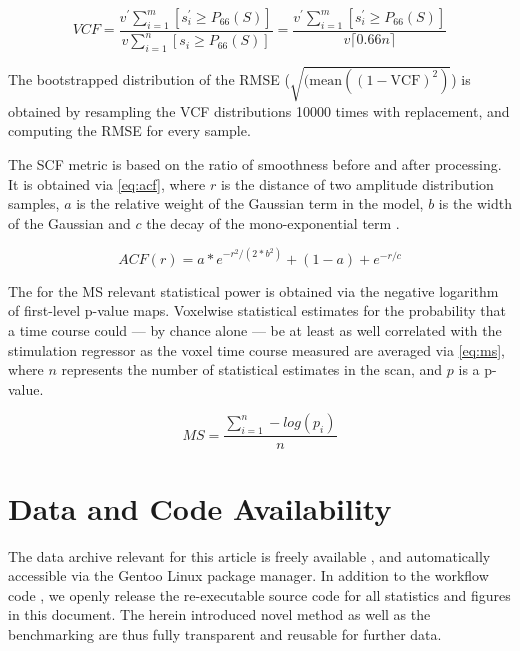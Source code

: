 \begin{equation} \label{eq:vcf}
        V\!C\!F
        = \frac{v^\prime\sum_{i=1}^m [s^\prime_i \geq P_{66}(S)]}{v\sum_{i=1}^n [s_i \geq P_{66}(S)]}
        = \frac{v^\prime\sum_{i=1}^m [s^\prime_i \geq P_{66}(S)]}{v \lceil0.66n\rceil}
\end{equation}

The bootstrapped distribution of the RMSE ($\sqrt{(\text{mean}((1 - \text{VCF})^2)}$) is obtained by resampling the VCF distributions 10000 times with replacement, and computing the RMSE for every sample.

The SCF metric is based on the ratio of smoothness before and after processing.
It is obtained via \cref{eq:acf}, where $r$ is the distance of two amplitude distribution samples, $a$ is the relative weight of the Gaussian term in the model, $b$ is the width of the Gaussian and $c$ the decay of the mono-exponential term \cite{cox2017fmri}.

\begin{equation} \label{eq:acf}
        ACF(r)
        = a * e^{ -r^{2}/ (2 * b^{2}) } + (1 - a) + e^{-r/c}
\end{equation}

The for the MS relevant statistical power is obtained via the negative logarithm of first-level p-value maps.
Voxelwise statistical estimates for the probability that a time course could --- by chance alone --- be at least as well correlated with the stimulation regressor as the voxel time course measured are averaged via \cref{eq:ms}, where $n$ represents the number of statistical estimates in the scan, and $p$ is a p-value.

\begin{equation} \label{eq:ms}
        M\!S = \frac{\sum_{i=1}^n -log(p_i)}{n}
\end{equation}

\section{Data and Code Availability}

The data archive relevant for this article is freely available \cite{mlebe_bidsdata}, and automatically accessible via the Gentoo Linux package manager.
In addition to the workflow code \cite{mlebe, samri}, we openly release the re-executable source code \cite{mlebe_repsep} for all statistics and figures in this document.
The herein introduced novel method as well as the benchmarking are thus fully transparent and reusable for further data.